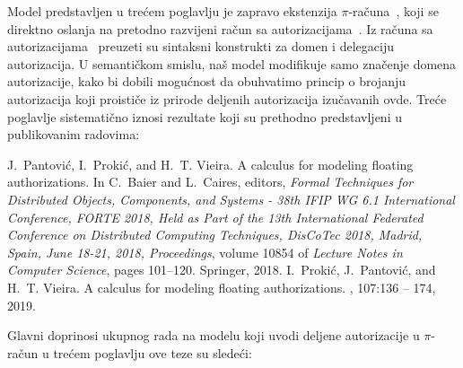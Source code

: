 Model predstavljen u tre\' cem poglavlju je zapravo ekstenzija $\pi$-ra\v cuna~\cite{pi_calculus}, koji se direktno oslanja na pretodno razvijeni ra\v cun sa autorizacijama~\cite{DBLP:journals/corr/GhilezanJPPV16, clar:eke}. Iz ra\v cuna sa autorizacijama~\cite{DBLP:journals/corr/GhilezanJPPV16} preuzeti su sintaksni konstrukti za domen i delegaciju autorizacija. U semanti\v ckom smislu, na\v s model modifikuje samo zna\v cenje domena autorizacije, kako bi dobili mogu\' cnost da obuhvatimo princip o brojanju autorizacija koji proisti\v ce iz prirode deljenih autorizacija izu\v cavanih ovde.
Tre\' ce poglavlje sistemati\v cno iznosi rezultate koji su prethodno predstavljeni u publikovanim radovima:
%
%
\begin{enumerate}
%
%
J.~Pantovi{\'c}, I.~Proki{\'c}, and H.~T. Vieira.
\newblock A calculus for modeling floating authorizations.
\newblock In C.~Baier and L.~Caires, editors, {\em Formal Techniques for
  Distributed Objects, Components, and Systems - 38th {IFIP} {WG} 6.1
  International Conference, {FORTE} 2018, Held as Part of the 13th
  International Federated Conference on Distributed Computing Techniques,
  DisCoTec 2018, Madrid, Spain, June 18-21, 2018, Proceedings}, volume 10854 of
  {\em Lecture Notes in Computer Science}, pages 101--120. Springer, 2018.
%
%
I.~Proki{\'c}, J.~Pantovi{\'c}, and H.~T. Vieira.
\newblock A calculus for modeling floating authorizations.
,
  107:136 -- 174, 2019.
%
%
%
\end{enumerate}
%
%
Glavni doprinosi ukupnog rada na modelu koji uvodi deljene autorizacije u $\pi$-ra\v cun u tre\' cem poglavlju ove teze su slede\' ci: 
